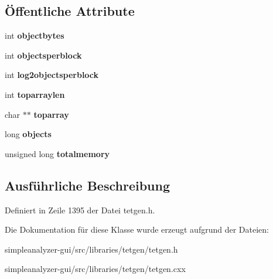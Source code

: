 \subsection*{Öffentliche Attribute}
\begin{DoxyCompactItemize}
\item 
\hypertarget{classtetgenmesh_1_1arraypool_a469ac2a2833a25faa0f99ab011122e2d}{int {\bfseries objectbytes}}\label{classtetgenmesh_1_1arraypool_a469ac2a2833a25faa0f99ab011122e2d}

\item 
\hypertarget{classtetgenmesh_1_1arraypool_a2b6ba46461d5c8f0e6043bdd111246dd}{int {\bfseries objectsperblock}}\label{classtetgenmesh_1_1arraypool_a2b6ba46461d5c8f0e6043bdd111246dd}

\item 
\hypertarget{classtetgenmesh_1_1arraypool_ab61ada3b2fc49879a160a919e9994279}{int {\bfseries log2objectsperblock}}\label{classtetgenmesh_1_1arraypool_ab61ada3b2fc49879a160a919e9994279}

\item 
\hypertarget{classtetgenmesh_1_1arraypool_aa9ced327d45678f31b4e7f8e75aff861}{int {\bfseries toparraylen}}\label{classtetgenmesh_1_1arraypool_aa9ced327d45678f31b4e7f8e75aff861}

\item 
\hypertarget{classtetgenmesh_1_1arraypool_a3a4e28a88226f1dd777773fe45094650}{char $\ast$$\ast$ {\bfseries toparray}}\label{classtetgenmesh_1_1arraypool_a3a4e28a88226f1dd777773fe45094650}

\item 
\hypertarget{classtetgenmesh_1_1arraypool_a23345232309fd68d2e3afa6d017299b0}{long {\bfseries objects}}\label{classtetgenmesh_1_1arraypool_a23345232309fd68d2e3afa6d017299b0}

\item 
\hypertarget{classtetgenmesh_1_1arraypool_af264f265d5752e75f50adea472ecd59f}{unsigned long {\bfseries totalmemory}}\label{classtetgenmesh_1_1arraypool_af264f265d5752e75f50adea472ecd59f}

\end{DoxyCompactItemize}


\subsection{Ausführliche Beschreibung}


Definiert in Zeile 1395 der Datei tetgen.\-h.



Die Dokumentation für diese Klasse wurde erzeugt aufgrund der Dateien\-:\begin{DoxyCompactItemize}
\item 
simpleanalyzer-\/gui/src/libraries/tetgen/tetgen.\-h\item 
simpleanalyzer-\/gui/src/libraries/tetgen/tetgen.\-cxx\end{DoxyCompactItemize}
